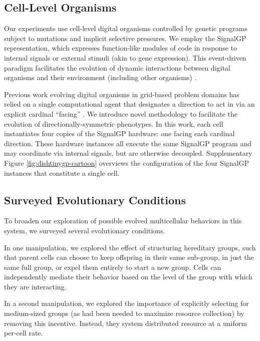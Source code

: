 \subsection{Cell-Level Organisms}

Our experiments use cell-level digital organisms controlled by genetic programs subject to mutations and implicit selective pressures.
We employ the SignalGP representation, which expresses function-like modules of code in response to internal signals or external stimuli (akin to gene expression).
This event-driven paradigm facilitates the evolution of dynamic interactions between digital organisms and their environment (including other organisms) \citep{lalejini2018evolving}.

Previous work evolving digital organisms in grid-based problem domains has relied on a single computational agent that designates a direction to act in via an explicit cardinal ``facing'' \citep{goldsby2014evolutionary, goldsby2018serendipitous, grabowski2010early, biswas2014causes, lalejini2018evolving}.
We introduce novel methodology to facilitate the evolution of directionally-symmetric phenotypes.
In this work, each cell instantiates four copies of the SignalGP hardware: one facing each cardinal direction.
These hardware instances all execute the same SignalGP program and may coordinate via internal signals, but are otherwise decoupled.
Supplementary Figure \ref{fig:dishtinygp-cartoon} overviews the configuration of the four SignalGP instances that constitute a single cell.

\subsection{Surveyed Evolutionary Conditions}

To broaden our exploration of possible evolved multicellular behaviors in this system, we surveyed several evolutionary conditions.

In one manipulation, we explored the effect of structuring hereditary groups, such that parent cells can choose to keep offspring in their same sub-group, in just the same full group, or expel them entirely to start a new group.
Cells can independently mediate their behavior based on the level of the group with which they are interacting.

In a second manipulation, we explored the importance of explicitly selecting for medium-sized groups (as had been needed to maximize resource collection) by removing this incentive.
Instead, they system distributed resource at a uniform per-cell rate.

